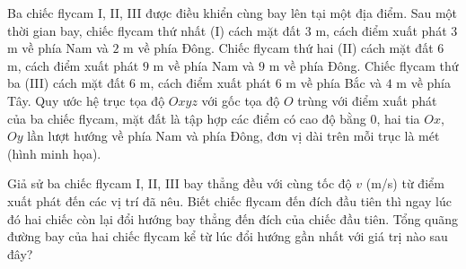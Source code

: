 \begin{ex}
Ba chiếc flycam I, II, III được điều khiển cùng bay lên tại một địa điểm. Sau một thời gian bay, chiếc flycam thứ nhất (I) cách mặt đất $3$ m, cách điểm xuất phát $3$ m về phía Nam và $2$ m về phía Đông. Chiếc flycam thứ hai (II) cách mặt đất $6$ m, cách điểm xuất phát $9$ m về phía Nam và $9$ m về phía Đông. Chiếc flycam thứ ba (III) cách mặt đất $6$ m, cách điểm xuất phát $6$ m về phía Bắc và $4$ m về phía Tây. Quy ước hệ trục tọa độ $Oxyz$ với gốc tọa độ $O$ trùng với điểm xuất phát của ba chiếc flycam, mặt đất là tập hợp các điểm có cao độ bằng $0$, hai tia $Ox$, $Oy$ lần lượt hướng về phía Nam và phía Đông, đơn vị dài trên mỗi trục là mét (hình minh họa).
\begin{center}
\end{center}
Giả sử ba chiếc flycam I, II, III bay thẳng đều với cùng tốc độ $v$ (m/s) từ điểm xuất phát đến các vị trí đã nêu. Biết chiếc flycam đến đích đầu tiên thì ngay lúc đó hai chiếc còn lại đổi hướng bay thẳng đến đích của chiếc đầu tiên. Tổng quãng đường bay của hai chiếc flycam kể từ lúc đổi hướng gần nhất với giá trị nào sau đây?
\end{ex}
